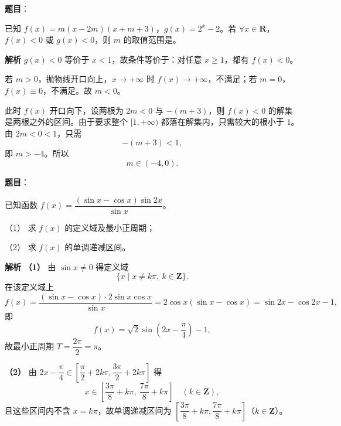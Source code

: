 \begin{answer}

\textbf{题目}：

已知 $f(x)=m(x-2m)(x+m+3)$，$g(x)=2^x-2$。若 $\forall x\in\mathbf R$，$f(x)<0$ 或 $g(x)<0$，则 $m$ 的取值范围是\gkblank{}。

\textbf{解析}
$g(x)<0$ 等价于 $x<1$，故条件等价于：对任意 $x\geqslant1$，都有 $f(x)<0$。

若 $m>0$，抛物线开口向上，$x\to+\infty$ 时 $f(x)\to+\infty$，不满足；若 $m=0$，$f(x)\equiv0$，不满足。故 $m<0$。

此时 $f(x)$ 开口向下，设两根为 $2m<0$ 与 $-(m+3)$，则 $f(x)<0$ 的解集是两根之外的区间。由于要求整个 $[1,+\infty)$ 都落在解集内，只需较大的根小于 $1$。由 $2m<0<1$，只需
\nopagebreak[4]
\[-(m+3)<1,\]
即 $m>-4$。所以
\nopagebreak[4]
\[m\in(-4,0).\]


\end{answer}
\begin{answer}

\textbf{题目}：

已知函数 $f(x)=\dfrac{(\sin x-\cos x)\sin2x}{\sin x}$。

（1） 求 $f(x)$ 的定义域及最小正周期；

（2） 求 $f(x)$ 的单调递减区间。

\textbf{解析}
\textbf{（1）} 由 $\sin x\neq0$ 得定义域
\nopagebreak[4]
\[\{x\mid x\neq k\pi,\ k\in\mathbf Z\}.\]
在该定义域上
\nopagebreak[4]
\[f(x)=\frac{(\sin x-\cos x)\cdot2\sin x\cos x}{\sin x}=2\cos x(\sin x-\cos x)=\sin2x-\cos2x-1,\]
即
\nopagebreak[4]
\[f(x)=\sqrt2\sin\left(2x-\frac\pi4\right)-1,\]
故最小正周期 $T=\dfrac{2\pi}2=\pi$。

\textbf{（2）} 由 $2x-\dfrac\pi4\in\left[\dfrac\pi2+2k\pi,\dfrac{3\pi}2+2k\pi\right]$ 得
\nopagebreak[4]
\[x\in\left[\frac{3\pi}8+k\pi,\ \frac{7\pi}8+k\pi\right]\quad(k\in\mathbf Z),\]
且这些区间内不含 $x=k\pi$，故单调递减区间为 $\left[\dfrac{3\pi}8+k\pi,\dfrac{7\pi}8+k\pi\right]$（$k\in\mathbf Z$）。



\end{answer}
